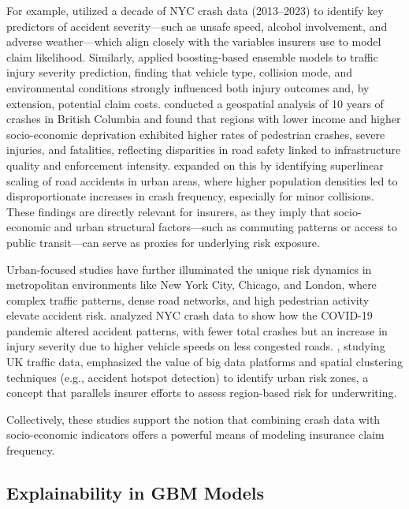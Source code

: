\documentclass[
  number,
  review,
  3p]{elsarticle}
\begin{document}
For example, \citet{adeniyi} utilized a decade of NYC crash data
(2013--2023) to identify key predictors of accident severity---such as
unsafe speed, alcohol involvement, and adverse weather---which align
closely with the variables insurers use to model claim likelihood.
Similarly, \citet{dong} applied boosting-based ensemble models to
traffic injury severity prediction, finding that vehicle type, collision
mode, and environmental conditions strongly influenced both injury
outcomes and, by extension, potential claim costs. \citet{brubacher}
conducted a geospatial analysis of 10 years of crashes in British
Columbia and found that regions with lower income and higher
socio-economic deprivation exhibited higher rates of pedestrian crashes,
severe injuries, and fatalities, reflecting disparities in road safety
linked to infrastructure quality and enforcement intensity.
\citet{cabrera} expanded on this by identifying superlinear scaling of
road accidents in urban areas, where higher population densities led to
disproportionate increases in crash frequency, especially for minor
collisions. These findings are directly relevant for insurers, as they
imply that socio-economic and urban structural factors---such as
commuting patterns or access to public transit---can serve as proxies
for underlying risk exposure.

Urban-focused studies have further illuminated the unique risk dynamics
in metropolitan environments like New York City, Chicago, and London,
where complex traffic patterns, dense road networks, and high pedestrian
activity elevate accident risk. \citet{adeniyi} analyzed NYC crash data
to show how the COVID-19 pandemic altered accident patterns, with fewer
total crashes but an increase in injury severity due to higher vehicle
speeds on less congested roads. \citet{feng}, studying UK traffic data,
emphasized the value of big data platforms and spatial clustering
techniques (e.g., accident hotspot detection) to identify urban risk
zones, a concept that parallels insurer efforts to assess region-based
risk for underwriting.

Collectively, these studies support the notion that combining crash data
with socio-economic indicators offers a powerful means of modeling
insurance claim frequency.

\subsection{\texorpdfstring{\textbf{Explainability in GBM
Models}}{Explainability in GBM Models}}\label{explainability-in-gbm-models}
\end{document}
